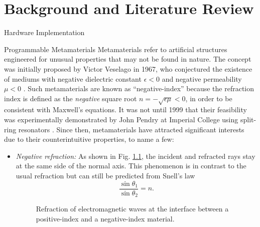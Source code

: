 
\graphicspath{{assets/chapter_2/}}

\chapter{Background and Literature Review}\label{ch:background}

\begin{section}{}


	\begin{subsection}{Hardware Implementation}
		\begin{subsubsection}{Programmable Metamaterials}
			Metamaterials refer to artificial structures engineered for unusual properties that may not be found in nature.
			The concept was initially proposed by Victor Veselago in 1967, who conjectured the existence of mediums with negative dielectric constant $\epsilon < 0$ and negative permeability $\mu < 0$ \cite{Veselago1968}.
			Such metamaterials are known as ``negative-index'' because the refraction index is defined as the \emph{negative} square root $n = - \sqrt{\epsilon \mu} < 0$, in order to be consistent with Maxwell's equations.
			It was not until 1999 that their feasibility was experimentally demonstrated by John Pendry at Imperial College using split-ring resonators \cite{Pendry1999}.
			Since then, metamaterials have attracted significant interests due to their counterintuitive properties, to name a few:
			\begin{itemize}
				\item \emph{Negative refraction:} As shown in Fig. \ref{fg:nim_refraction}, the incident and refracted rays stay at the same side of the normal axis. This phenomenon is in contrast to the usual refraction but can still be predicted from Snell's law
				\begin{equation}
					\frac{\sin \theta_1}{\sin \theta_2} = n.
				\end{equation}
				\begin{figure}[H]
					\centering
					\resizebox{0.5\columnwidth}{!}{
						
					}
					\caption{Refraction of electromagnetic waves at the interface between a positive-index and a negative-index material.}
					\label{fg:nim_refraction}
				\end{figure}

\end{itemize}
\end{subsubsection}
\end{subsection}
\end{section}
